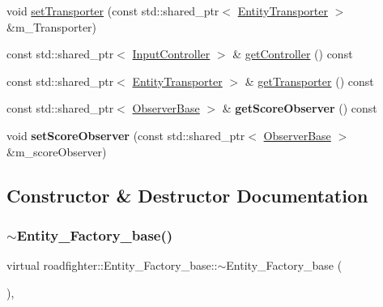\begin{DoxyCompactItemize}
\item 
void \hyperlink{classroadfighter_1_1Entity__Factory__base_ab3338a586002c58ad7581e1046be9ba5}{set\+Transporter} (const std\+::shared\+\_\+ptr$<$ \hyperlink{classroadfighter_1_1EntityTransporter}{Entity\+Transporter} $>$ \&m\+\_\+\+Transporter)
\item 
const std\+::shared\+\_\+ptr$<$ \hyperlink{classroadfighter_1_1InputController}{Input\+Controller} $>$ \& \hyperlink{classroadfighter_1_1Entity__Factory__base_a3ea098a47127d87d64a6a8623035007a}{get\+Controller} () const
\item 
const std\+::shared\+\_\+ptr$<$ \hyperlink{classroadfighter_1_1EntityTransporter}{Entity\+Transporter} $>$ \& \hyperlink{classroadfighter_1_1Entity__Factory__base_a4a8d467738722cfb4f343de72a4a355a}{get\+Transporter} () const
\item 
\mbox{\label{classroadfighter_1_1Entity__Factory__base_a7b45161be0cda25b24375f6e99594bcc}} 
const std\+::shared\+\_\+ptr$<$ \hyperlink{classObserverBase}{Observer\+Base} $>$ \& {\bfseries get\+Score\+Observer} () const
\item 
\mbox{\label{classroadfighter_1_1Entity__Factory__base_a59240ab3a76f6d54b051bc560b6d3aa1}} 
void {\bfseries set\+Score\+Observer} (const std\+::shared\+\_\+ptr$<$ \hyperlink{classObserverBase}{Observer\+Base} $>$ \&m\+\_\+score\+Observer)
\end{DoxyCompactItemize}


\subsection{Constructor \& Destructor Documentation}
\mbox{\label{classroadfighter_1_1Entity__Factory__base_a19ec21ceb4fd132712ef1bf131b4be9b}} 
\subsubsection{\texorpdfstring{$\sim$\+Entity\+\_\+\+Factory\+\_\+base()}{~Entity\_Factory\_base()}}
{\footnotesize\ttfamily virtual roadfighter\+::\+Entity\+\_\+\+Factory\+\_\+base\+::$\sim$\+Entity\+\_\+\+Factory\+\_\+base (\begin{DoxyParamCaption}{ }\end{DoxyParamCaption})\hspace{0.3cm}{\ttfamily [virtual]}, {\ttfamily [default]}}

